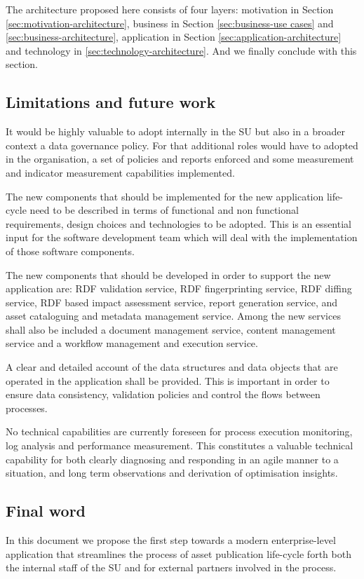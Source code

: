 	The architecture proposed here consists of four layers: motivation in Section \ref{sec:motivation-architecture}, business in Section \ref{sec:business-use cases} and \ref{sec:business-architecture}, application in Section \ref{sec:application-architecture} and technology in \ref{sec:technology-architecture}. And we finally conclude with this section.
	
	\subsection{Limitations and future work}
	
	It would be highly valuable to adopt internally in the SU but also in a broader context a data governance policy. For that additional roles would have to adopted in the organisation, a set of policies and reports enforced and some measurement and indicator measurement capabilities implemented. 
	
	The new components that should be implemented for the new application life-cycle need to be described in terms of functional and non functional requirements, design choices and technologies to be adopted. This is an essential input for the software development team which will deal with the implementation of those software components. 
	
	The new components that should be developed in order to support the new application are: RDF validation service, RDF fingerprinting service, RDF diffing service, RDF based impact assessment service, report generation service, and asset cataloguing and metadata management service. Among the new services shall also be included a document management service, content management service and a workflow management and execution service. 
	
	A clear and detailed account of the data structures and data objects that are operated in the application shall be provided. This is important in order to ensure data consistency, validation policies and control the flows between processes. 
	
	No technical capabilities are currently foreseen for process execution monitoring, log analysis and performance measurement. This constitutes a valuable technical capability for both clearly diagnosing and responding in an agile manner to a situation, and long term observations and derivation of optimisation insights.
	
    \subsection{Final word}
    In this document we propose the first step towards a modern enterprise-level application that streamlines the process of asset publication life-cycle forth both the internal staff of the SU and for external partners involved in the process. 
    
